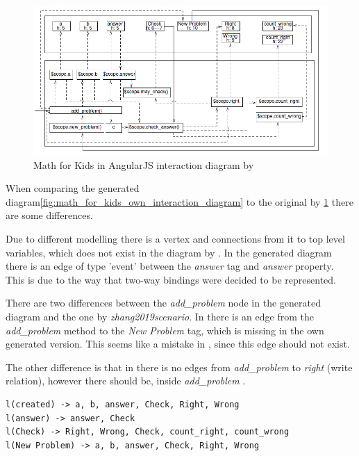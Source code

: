 \begin{figure}[H]
    \includegraphics[width=\textwidth]{images/interaction_diagram_zhang.png}
     \caption{Math for Kids in AngularJS interaction diagram by \textcite{zhang2019scenario}}
     \label{fig:math_for_kids_zhang_interaction_diagram}
\end{figure}

When comparing the generated diagram\ref{fig:math_for_kids_own_interaction_diagram} to the original by \textcite{zhang2019scenario} \ref{fig:math_for_kids_zhang_interaction_diagram} there are some differences.

Due to different modelling there is a  vertex and connections from it to top level variables, which does not exist in the diagram by \textcite{zhang2019scenario}. In the generated diagram there is an edge of type 'event' between the \textit{answer} tag and \textit{answer} property. This is due to the way that two-way bindings were decided to be represented.

There are two differences between the \textit{add\_problem} node in the generated diagram and the one by \textit{zhang2019scenario}.
In \textcite{zhang2019scenario} there is an edge from
the \textit{add\_problem} method to the \textit{New Problem} tag, which is missing in the own generated version. This seems like a mistake in \parencite{zhang2019scenario}, since this edge should not exist.

The other difference is that in \parencite{zhang2019scenario} there is no edges from \textit{add\_problem} to \textit{right} (write relation), however there should be, 
inside \textit{add\_problem} .

\begin{lstlisting}
l(created) -> a, b, answer, Check, Right, Wrong
l(answer) -> answer, Check
l(Check) -> Right, Wrong, Check, count_right, count_wrong
l(New Problem) -> a, b, answer, Check, Right, Wrong
\end{lstlisting}

